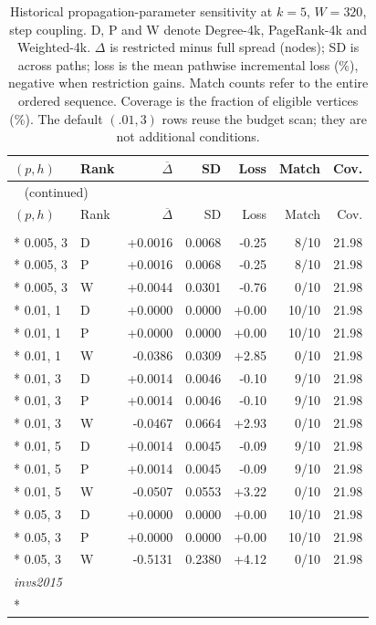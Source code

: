 \begin{longtable}{llrrrrr}
\caption{Historical propagation-parameter sensitivity at $k=5$, $W=320$, step coupling. D, P and W denote Degree-4k, PageRank-4k and Weighted-4k. $\Delta$ is restricted minus full spread (nodes); SD is across paths; loss is the mean pathwise incremental loss (\%), negative when restriction gains. Match counts refer to the entire ordered sequence. Coverage is the fraction of eligible vertices (\%). The default $(.01,3)$ rows reuse the budget scan; they are not additional conditions.}\label{tab:hist-parameters}\\
\toprule
$(p,h)$ & Rank & $\overline\Delta$ & SD & Loss & Match & Cov. \\
\midrule
\endfirsthead
\multicolumn{7}{l}{\tablename~\thetable{} (continued)}\\
\toprule
$(p,h)$ & Rank & $\overline\Delta$ & SD & Loss & Match & Cov. \\
\midrule
\endhead
\bottomrule
\endfoot
\multicolumn{7}{l}{\textit{invs2013}}\\*
0.005, 3 & D & +0.0016 & 0.0068 & -0.25 & 8/10 & 21.98\\*
0.005, 3 & P & +0.0016 & 0.0068 & -0.25 & 8/10 & 21.98\\*
0.005, 3 & W & +0.0044 & 0.0301 & -0.76 & 0/10 & 21.98\\*
0.01, 1 & D & +0.0000 & 0.0000 & +0.00 & 10/10 & 21.98\\*
0.01, 1 & P & +0.0000 & 0.0000 & +0.00 & 10/10 & 21.98\\*
0.01, 1 & W & -0.0386 & 0.0309 & +2.85 & 0/10 & 21.98\\*
0.01, 3 & D & +0.0014 & 0.0046 & -0.10 & 9/10 & 21.98\\*
0.01, 3 & P & +0.0014 & 0.0046 & -0.10 & 9/10 & 21.98\\*
0.01, 3 & W & -0.0467 & 0.0664 & +2.93 & 0/10 & 21.98\\*
0.01, 5 & D & +0.0014 & 0.0045 & -0.09 & 9/10 & 21.98\\*
0.01, 5 & P & +0.0014 & 0.0045 & -0.09 & 9/10 & 21.98\\*
0.01, 5 & W & -0.0507 & 0.0553 & +3.22 & 0/10 & 21.98\\*
0.05, 3 & D & +0.0000 & 0.0000 & +0.00 & 10/10 & 21.98\\*
0.05, 3 & P & +0.0000 & 0.0000 & +0.00 & 10/10 & 21.98\\*
0.05, 3 & W & -0.5131 & 0.2380 & +4.12 & 0/10 & 21.98\\
\multicolumn{7}{l}{\textit{invs2015}}\\*

\end{longtable}
